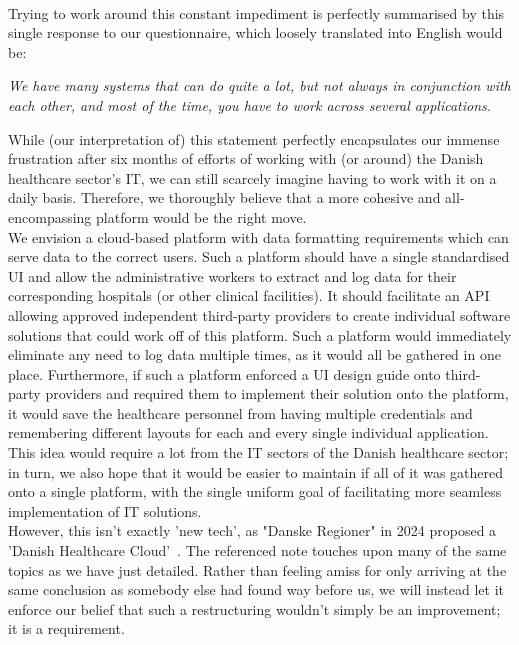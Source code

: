 \\
Trying to work around this constant impediment is perfectly summarised by this single response to our questionnaire, which loosely translated into English would be:
\begin{center}
 \textit{We have many systems that can do quite a lot, but not always in conjunction with each other, and most of the time, you have to work across several applications.}
\end{center}
While (our interpretation of) this statement perfectly encapsulates our immense frustration after six months of efforts of working with (or around) the Danish healthcare sector's IT, we can still scarcely imagine having to work with it on a daily basis. Therefore, we thoroughly believe that a more cohesive and all-encompassing platform would be the right move.
\\
We envision a cloud-based platform with data formatting requirements which can serve data to the correct users. Such a platform should have a single standardised UI  and allow the administrative workers to extract and log data for their corresponding hospitals (or other clinical facilities). It should facilitate an API allowing approved independent third-party providers to create individual software solutions that could work off of this platform. Such a platform would immediately eliminate any need to log data multiple times, as it would all be gathered in one place. Furthermore, if such a platform enforced a UI design guide onto third-party providers and required them to implement their solution onto the platform, it would save the healthcare personnel from having multiple credentials and remembering different layouts for each and every single individual application.
\\
This idea would require a lot from the IT sectors of the Danish healthcare sector; in turn, we also hope that it would be easier to maintain if all of it was gathered onto a single platform, with the single uniform goal of facilitating more seamless implementation of IT solutions.
\\
However, this isn't exactly 'new tech', as "Danske Regioner" in 2024 proposed a 'Danish Healthcare Cloud'~\cite{Den-Reg-digitalisation}. The referenced note touches upon many of the same topics as we have just detailed. Rather than feeling amiss for only arriving at the same conclusion as somebody else had found way before us, we will instead let it enforce our belief that such a restructuring wouldn't simply be an improvement; it is a requirement.
\\
